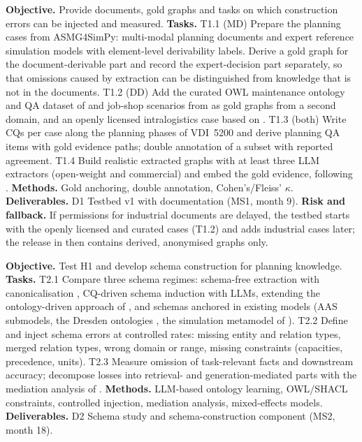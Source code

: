 \textbf{Objective.} Provide documents, gold graphs and tasks on which construction errors can be injected and measured.
\textbf{Tasks.} T1.1 (MD) Prepare the planning cases from ASMG4SimPy: multi-modal planning documents and expert reference simulation models with element-level derivability labels. Derive a gold graph for the document-derivable part and record the expert-decision part separately, so that omissions caused by extraction can be distinguished from knowledge that is not in the documents.  T1.2 (DD) Add the curated \ac{OWL} maintenance ontology and \ac{QA} dataset of \parencite{ludwig2025ontology} and job-shop scenarios from \parencite{ludwig2024speech} as gold graphs from a second domain, and an openly licensed intralogistics case based on \parencite{betker2026craneflow}. T1.3 (both) Write \acp{CQ} per case along the planning phases of VDI~5200 \parencite{vdi5200} and derive planning \ac{QA} items with gold evidence paths; double annotation of a subset with reported agreement. T1.4 Build realistic extracted graphs with at least three \ac{LLM} extractors (open-weight and commercial) and embed the gold evidence, following \parencite{reider2026graph}.
\textbf{Methods.} Gold anchoring, double annotation, Cohen's/Fleiss' $\kappa$.
\textbf{Deliverables.} D1 Testbed v1 with documentation (MS1, month 9).
\textbf{Risk and fallback.} If permissions for industrial documents are delayed, the testbed starts with the openly licensed and curated cases (T1.2) and adds industrial cases later; the release in  then contains derived, anonymised graphs only.

\textbf{Objective.} Test H1 and develop schema construction for planning knowledge.
\textbf{Tasks.} T2.1 Compare three schema regimes: schema-free extraction with canonicalisation \parencite{zhang2024edc,mo2025kggen}, \ac{CQ}-driven schema induction with \acp{LLM}, extending the ontology-driven approach of \parencite{ludwig2024speech}, and schemas anchored in existing models (\ac{AAS} submodels, the Dresden ontologies \parencite{ludwig2025ontology,kosse2024semantic}, the simulation metamodel of \parencite{rehm2010metamodell}). T2.2 Define and inject schema errors at controlled rates: missing entity and relation types, merged relation types, wrong domain or range, missing constraints (capacities, precedence, units). T2.3 Measure omission of task-relevant facts and downstream accuracy; decompose losses into retrieval- and generation-mediated parts with the mediation analysis of \parencite{reider2026graph}.
\textbf{Methods.} \ac{LLM}-based ontology learning, \ac{OWL}/SHACL constraints, controlled injection, mediation analysis, mixed-effects models.
\textbf{Deliverables.} D2 Schema study and schema-construction component (MS2, month 18).

